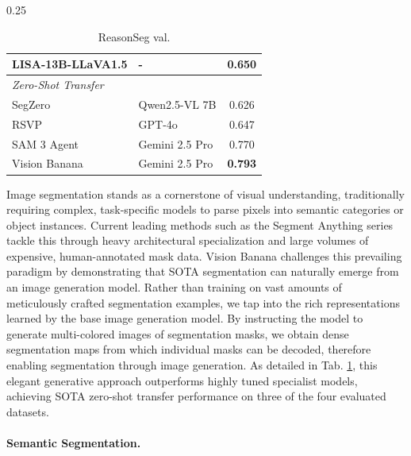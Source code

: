 \documentclass[11pt, a4paper, copyright, gdm]{google}
\begin{document}
\begin{table}[h]
\begin{subtable}[t]{0.25\textwidth}
\begin{tabular}[t]{@{}llc@{}}
        \color{gray} LISA-13B-LLaVA1.5 & \color{gray} - & \color{gray} 0.650 \\
        \midrule
        \multicolumn{2}{l}{\textit{Zero-Shot Transfer}} \\
        \midrule
        SegZero & Qwen2.5-VL 7B & 0.626 \\
        RSVP & GPT-4o & 0.647 \\
        SAM 3 Agent & Gemini 2.5 Pro & 0.770 \\
        Vision Banana & Gemini 2.5 Pro & \textbf{\color{win_green} 0.793} \\
        \bottomrule
        \end{tabular}
        \caption{ReasonSeg val.}
        \label{tab-seg-reasonseg}
    \end{subtable}

\label{tab-segmentation-all}
\end{table}


Image segmentation stands as a cornerstone of visual understanding, traditionally requiring complex, task-specific models to parse pixels into semantic categories or object instances. Current leading methods such as the Segment Anything series \citep{kirillov2023segment,ravi2024sam2,sam3} tackle this through heavy architectural specialization and large volumes of expensive, human-annotated mask data. Vision Banana challenges this prevailing paradigm by demonstrating that SOTA segmentation can naturally emerge from an image generation model. Rather than training on vast amounts of meticulously crafted segmentation examples, we tap into the rich representations learned by the base image generation model. By instructing the model to generate multi-colored images of segmentation masks, we obtain dense segmentation maps from which individual masks can be decoded, therefore enabling segmentation through image generation. As detailed in Tab. \ref{tab-segmentation-all}, this elegant generative approach outperforms highly tuned specialist models, achieving SOTA zero-shot transfer performance on three of the four evaluated datasets.


\paragraph{Semantic Segmentation.}
\end{document}
